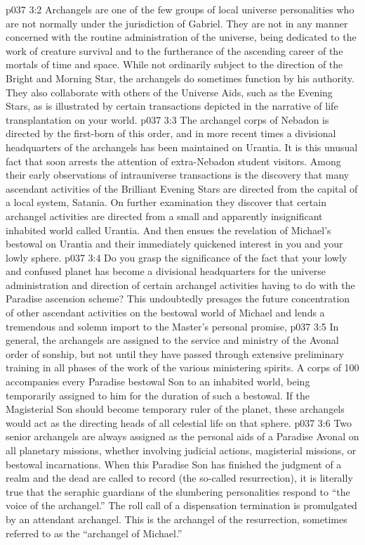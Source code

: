 \vs p037 3:2 Archangels are one of the few groups of local universe personalities who are not normally under the jurisdiction of Gabriel. They are not in any manner concerned with the routine administration of the universe, being dedicated to the work of creature survival and to the furtherance of the ascending career of the mortals of time and space. While not ordinarily subject to the direction of the Bright and Morning Star, the archangels do sometimes function by his authority. They also collaborate with others of the Universe Aids, such as the Evening Stars, as is illustrated by certain transactions depicted in the narrative of life transplantation on your world.
\vs p037 3:3 \pc The archangel corps of Nebadon is directed by the first\hyp{}born of this order, and in more recent times a divisional headquarters of the archangels has been maintained on Urantia. It is this unusual fact that soon arrests the attention of extra\hyp{}Nebadon student visitors. Among their early observations of intrauniverse transactions is the discovery that many ascendant activities of the Brilliant Evening Stars are directed from the capital of a local system, Satania. On further examination they discover that certain archangel activities are directed from a small and apparently insignificant inhabited world called Urantia. And then ensues the revelation of Michael’s bestowal on Urantia and their immediately quickened interest in you and your lowly sphere.
\vs p037 3:4 Do you grasp the significance of the fact that your lowly and confused planet has become a divisional headquarters for the universe administration and direction of certain archangel activities having to do with the Paradise ascension scheme? This undoubtedly presages the future concentration of other ascendant activities on the bestowal world of Michael and lends a tremendous and solemn import to the Master’s personal promise, 
\vs p037 3:5 \pc In general, the archangels are assigned to the service and ministry of the Avonal order of sonship, but not until they have passed through extensive preliminary training in all phases of the work of the various ministering spirits. A corps of 100 accompanies every Paradise bestowal Son to an inhabited world, being temporarily assigned to him for the duration of such a bestowal. If the Magisterial Son should become temporary ruler of the planet, these archangels would act as the directing heads of all celestial life on that sphere.
\vs p037 3:6 Two senior archangels are always assigned as the personal aids of a Paradise Avonal on all planetary missions, whether involving judicial actions, magisterial missions, or bestowal incarnations. When this Paradise Son has finished the judgment of a realm and the dead are called to record (the so\hyp{}called resurrection), it is literally true that the seraphic guardians of the slumbering personalities respond to “the voice of the archangel.” The roll call of a dispensation termination is promulgated by an attendant archangel. This is the archangel of the resurrection, sometimes referred to as the “archangel of Michael.”
